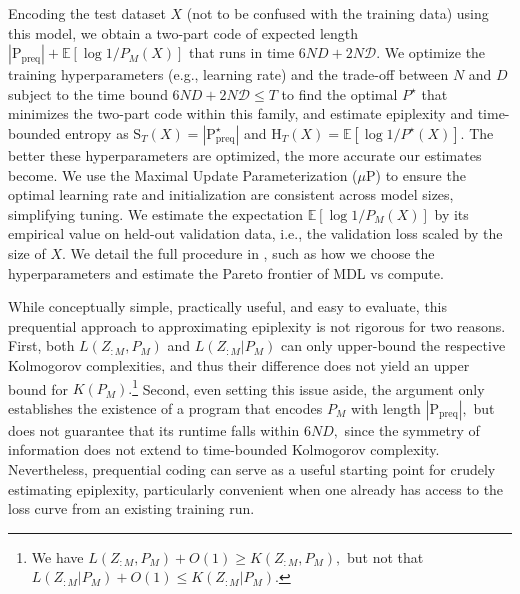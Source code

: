 \documentclass[twoside]{article}
\newcommand{\E}{\mathbb{E}}
\newcommand{\D}{\mathcal{D}}
\newcommand{\rH}{\mathrm{H}}
\newcommand{\rS}{\mathrm{S}}
\begin{document}
Encoding the test dataset $X$ (not to be confused with the training data) using this model, we obtain a two-part code of expected length $|\mathrm{P}_{\mathrm{preq}}| + \E[\log 1/P_M(X)]$ that runs in time $6ND + 2N\D.$ We optimize the training hyperparameters (e.g., learning rate) and the trade-off between $N$ and $D$ subject to the time bound $6ND + 2N\D \leq T$ to find the optimal $P^\star$ that minimizes the two-part code within this family, and estimate epiplexity and time-bounded entropy as $\rS_T(X) = |\mathrm{P}_{\mathrm{preq}}^\star|$ and $\rH_T(X)= \E[\log1/P^\star(X)].$ The better these hyperparameters are optimized, the more accurate our estimates become. We use the Maximal Update Parameterization ($\mu$P) \citep{yang2022tensor} to ensure the optimal learning rate and initialization are consistent across model sizes, simplifying tuning. We estimate the expectation $\E[\log 1/P_M(X)]$ by its empirical value on held-out validation data, i.e., the validation loss scaled by the size of $X$. We detail the full procedure in , such as how we choose the hyperparameters and estimate the Pareto frontier of MDL vs compute.

While conceptually simple, practically useful, and easy to evaluate, this prequential approach to approximating epiplexity is not rigorous for two reasons. First, both $L({Z_{:M}, P_M})$ and $L({Z_{:M} | P_M})$ can only upper-bound the respective Kolmogorov complexities, and thus their difference does not yield an upper bound for $K(P_M).$\footnote{We have $L({Z_{:M}, P_M}) + O(1) \geq K(Z_{:M}, P_M),$ but not that $L({Z_{:M} | P_M}) + O(1) \leq K(Z_{:M} | P_M).$} Second, even setting this issue aside, the argument only establishes the existence of a program that encodes $P_M$ with length $|\mathrm{P}_{\mathrm{preq}}|,$ but does not guarantee that its runtime falls within $6ND,$ since the symmetry of information does not extend to time-bounded Kolmogorov complexity. Nevertheless, prequential coding can serve as a useful starting point for crudely estimating epiplexity, particularly convenient when one already has access to the loss curve from an existing training run.
%
\end{document}

